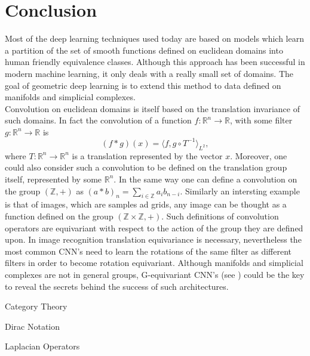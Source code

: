 \documentclass[12pt,a4paper]{report}
\theoremstyle{plain}
\theoremstyle{definition}
\theoremstyle{remark}
\newcommand{\Z}{\mathbb{Z}}
\newcommand{\R}{\mathbb{R}}
\newcommand{\scal}[2]{\langle #1, #2 \rangle}
\begin{document}
   \chapter*{Conclusion}
        Most of the deep learning techniques used today are based on models which learn a partition of the set of smooth functions defined on euclidean 
        domains into human friendly equivalence classes. Although this approach has been successful in modern machine learning, it only deals with a really 
        small set of domains. The goal of geometric deep learning is to extend this method to data defined on manifolds and simplicial complexes.\\
        Convolution on euclidean domains is itself based on the translation invariance of such domains. In fact the convolution of a function $f : \R^n \to \R$,
        with some filter $g:\R^n \to \R$ is \[(f * g)(x) = \scal{f}{g \circ T^{-1}}_{L^2},\] where $T:\R^n \to \R^n$ is a translation represented by the vector $x$.
        Moreover, one could also consider such a convolution to be defined on the translation group itself, represented by some $\R^n$. 
        In the same way one can define a convolution on the group $(\Z,+)$ as $(a * b)_n = \sum_{i \in \Z}a_i b_{n-i}$.
        Similarly an intersting example is that of images, which are samples ad grids, any image can be thought as a function defined on the group $(\Z \times \Z, +)$.
        Such definitions of convolution operators are equivariant with respect to the action of the group they are defined upon.
        In image recognition translation equivariance is necessary, nevertheless the most common CNN's need to learn the rotations of the same filter as different 
        filters in order to become rotation equivariant. Although manifolds and simplicial complexes are not in general groups, G-equivariant CNN's (see \cite{gcnn})
        could be the key to reveal the secrets behind the success of such architectures.
    \begin{appendices}
        \begin{chapter}{Category Theory}
            \label{app:A}
            
        \end{chapter}
        \begin{chapter}{Dirac Notation}
            \label{app:B}
            
        \end{chapter}
        \begin{chapter}{Laplacian Operators}
            \label{app:C}
            
        \end{chapter}
    \end{appendices}
    \newpage
    \printbibliography[heading = bibintoc]
\end{document}
